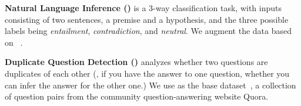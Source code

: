 \textbf{Natural Language Inference (\nli)} is a 3-way classification task, with inputs consisting of two sentences, a premise and a hypothesis, and the three possible labels being \emph{entailment}, \emph{contradiction}, and \emph{neutral}.
We augment the data based on \dnli~\cite{bowman-etal-2015-large}. 
 
\textbf{Duplicate Question Detection (\qqp)} analyzes whether two questions are duplicates of each other (\ie, if you have the answer to one question, whether you can infer the answer for the other one.) 
We use \dqqp as the base dataset~\cite{wang2018glue}, a collection of question pairs from the community question-answering website Quora.

